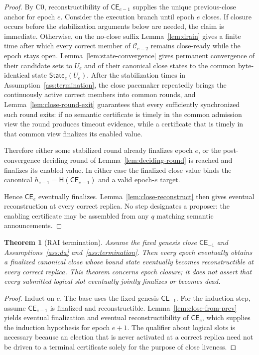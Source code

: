 \documentclass[11pt]{article}
\newtheorem{theorem}{Theorem}
\theoremstyle{definition}
\theoremstyle{remark}
\newcommand{\C}{\mathcal C}
\newcommand{\CE}{\mathsf{CE}}
\newcommand{\State}{\mathsf{State}}
\newcommand{\hash}{\mathsf{H}}
\begin{document}
\begin{proof}
By C0, reconstructibility of $\CE_{e-1}$ supplies the unique previous-close anchor for epoch $e$. Consider the execution branch until epoch $e$ closes. If closure occurs before the stabilization arguments below are needed, the claim is immediate. Otherwise, on the no-close suffix Lemma~\ref{lem:drain} gives a finite time after which every correct member of $\C_{e-2}$ remains close-ready while the epoch stays open. Lemma~\ref{lem:state-convergence} gives permanent convergence of their candidate sets to $U_e$ and of their canonical close states to the common byte-identical state $\State_e(U_e)$. After the stabilization times in Assumption~\ref{ass:termination}, the close pacemaker repeatedly brings the continuously active correct members into common rounds, and Lemma~\ref{lem:close-round-exit} guarantees that every sufficiently synchronized such round exits: if no semantic certificate is timely in the common admission view the round produces timeout evidence, while a certificate that is timely in that common view finalizes its enabled value.

Therefore either some stabilized round already finalizes epoch $e$, or the post-convergence deciding round of Lemma~\ref{lem:deciding-round} is reached and finalizes its enabled value. In either case the finalized close value binds the canonical $h_{e-1}=\hash(\CE_{e-1})$ and a valid epoch-$e$ target.

Hence $\CE_e$ eventually finalizes. Lemma~\ref{lem:close-reconstruct} then gives eventual reconstruction at every correct replica. No step designates a proposer: the enabling certificate may be assembled from any $q$ matching semantic announcements.
\end{proof}

\begin{theorem}[RAI termination]
\label{thm:termination}
Assume the fixed genesis close $\CE_{-1}$ and Assumptions~\ref{ass:da} and~\ref{ass:termination}. Then every epoch eventually obtains a finalized canonical close whose bound state eventually becomes reconstructible at every correct replica. This theorem concerns epoch closure; it does not assert that every submitted logical slot eventually jointly finalizes or becomes dead.
\end{theorem}

\begin{proof}
Induct on $e$. The base uses the fixed genesis $\CE_{-1}$. For the induction step, assume $\CE_{e-1}$ is finalized and reconstructible. Lemma~\ref{lem:close-from-prev} yields eventual finalization and eventual reconstructibility of $\CE_e$, which supplies the induction hypothesis for epoch $e+1$. The qualifier about logical slots is necessary because an election that is never activated at a correct replica need not be driven to a terminal certificate solely for the purpose of close liveness.
\end{proof}
\end{document}
